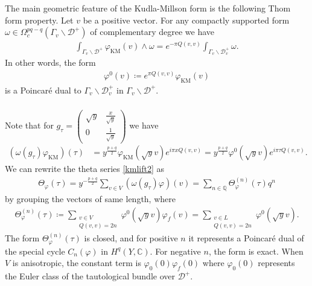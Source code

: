 \documentclass[11pt]{article} %
\newcommand{\8}{\infty}
\newcommand{\KM}{\operatorname{KM}}
\newcommand{\D}{\mathcal{D}}
\newcommand{\Q}{\mathbb{Q}}
\newcommand{\C}{\mathbb{C}}
\newcommand{\fin}{f}
\theoremstyle{mytheoremstyle}
\theoremstyle{remark}
\numberwithin{equation}{section}
\begin{document}
The main geometric feature of the Kudla-Millson form is the following Thom form property. Let $v$ be a positive vector. For any compactly supported form $\omega \in \Omega_c^{pq-q}(\Gamma_v \backslash \D^+)$ of complementary degree we have
\begin{align}
    \int_{\Gamma_v \backslash \D^+} \varphi_{\KM}(v) \wedge \omega= e^{-\pi Q(v,v)} \int_{\Gamma_v \backslash \D^+_v}\omega.
\end{align}
In other words, the form 
\begin{align}
    \varphi^0(v) \coloneqq e^{\pi Q(v,v)}\varphi_{\KM}(v)
\end{align}
is a Poincaré dual to $\Gamma_v \backslash \D^+_v$ in $\Gamma_v \backslash \D^+$.



\subsubsection{} Note that for $g_\tau=\begin{pmatrix}
    \sqrt{y} & \frac{x}{\sqrt{y}} \\ 0 & \frac{1}{\sqrt{y}}
\end{pmatrix}$ we have
\begin{align}
    (\omega(g_\tau)\varphi_{\KM})(\tau)& = y^{\frac{p+q}{2}}\varphi_{\KM}(\sqrt{y}v)e^{i\pi x Q(v,v)}= y^{\frac{p+q}{2}}\varphi^0(\sqrt{y}v)e^{i\pi \tau Q(v,v)}.
\end{align}We can rewrite the theta series \eqref{kmlift2} as
\begin{align}
   \Theta_\varphi(\tau) = y^{-\frac{p+q}{2}} \sum_{v \in V} (\omega(g_\tau)\varphi)(v)  = \sum_{n \in \Q} \Theta_\varphi^{(n)}(\tau)q^n
\end{align}
by grouping the vectors of same length, where
\begin{align}
    \Theta_\varphi^{(n)}(\tau) \coloneqq \sum_{\substack{ v \in V \\ Q(v,v)=2n}} \varphi^{0}(\sqrt{y}v) \varphi_\fin(v)=\sum_{\substack{ v \in L \\ Q(v,v)=2n}} \varphi^{0}(\sqrt{y}v).
\end{align}
The form $\Theta_\varphi^{(n)}(\tau)$ is closed, and for positive $n$ it represents a Poincaré dual of the special cycle $C_n(\varphi)$ in $H^q(Y,\C)$. For negative $n$, the form is exact. When $V$ is anisotropic, the constant term is $\varphi_{0}(0) \varphi_\fin(0)$ where $\varphi_{0}(0)$ represents the Euler class of the tautological bundle over $\D^+$. 
\end{document}

